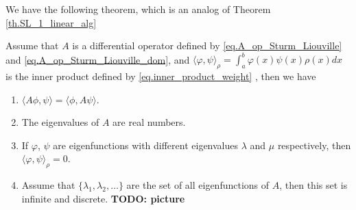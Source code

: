 We have the following theorem, which is an analog of Theorem \ref{th.SL_1_linear_alg}
\begin{theorem}\label{th.SL_1} Assume that $A$ is a differential operator defined by \eqref{eq.A_op_Sturm_Liouville} and \eqref{eq.A_op_Sturm_Liouville_dom}, and $\langle\varphi, \psi\rangle_\rho=\int_a^b \varphi(x) \psi(x) \rho(x) dx$ is the inner product defined by \eqref{eq.inner_product_weight} , then we have
\begin{enumerate}
    \item $\langle A \phi, \psi\rangle = \langle \phi, A\psi\rangle$.
    \item The eigenvalues of $A$ are real numbers.
    \item If $\varphi$, $\psi$ are eigenfunctions with different eigenvalues $\lambda$ and $\mu$ respectively, then $\langle \varphi, \psi\rangle_\rho = 0$.
    \item Assume that $\{\lambda_1,\lambda_2,\dots\}$ are the set of all eigenfunctions of $A$, then this set is infinite and discrete. \textbf{TODO: picture}
\end{enumerate}
\end{theorem}
